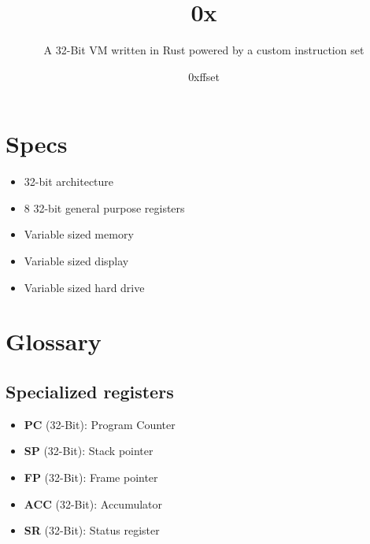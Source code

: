 \documentclass[titlepage]{scrartcl}
\title{0x}
\subtitle{A 32-Bit VM written in Rust powered by a custom instruction set}
\author{0xffset}
\date{}
\begin{document}
\maketitle
\newpage
\tableofcontents
\newpage

\section{Specs}
\begin{itemize}
	\item 32-bit architecture
	\item 8 32-bit general purpose registers
	\item Variable sized memory
	\item Variable sized display
	\item Variable sized hard drive
\end{itemize}
\newpage

\section{Glossary}
\subsection{Specialized registers}
\begin{itemize}
	\item \textbf{PC} (32-Bit): Program Counter
	\item \textbf{SP} (32-Bit): Stack pointer
	\item \textbf{FP} (32-Bit): Frame pointer
	\item \textbf{ACC} (32-Bit): Accumulator
	\item \textbf{SR} (32-Bit): Status register
\end{itemize}
\end{document}
